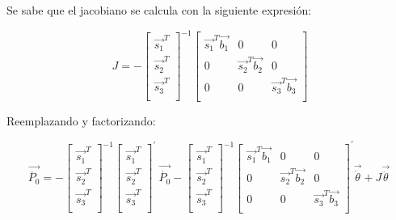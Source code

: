 \newpage
        Se sabe que el jacobiano se calcula con la siguiente expresión: 
        
         \[ J=- \left[ \begin{matrix}
        \overrightarrow{s_{1}}^{T}\\
        \overrightarrow{s_{2}}^{T}\\
        \overrightarrow{s_{3}}^{T}\\
        \end{matrix}
         \right] ^{-1} \left[ \begin{matrix}
        \overrightarrow{s_{1}}^{T}\overrightarrow{b_{1}}  &  0  &  0\\
        0  &  \overrightarrow{s_{2}}^{T}\overrightarrow{b_{2}}  &  0\\
        0  &  0  &  \overrightarrow{s_{3}}^{T}\overrightarrow{b_{3}}\\
        \end{matrix}
         \right]  \] 
        
        Reemplazando y factorizando:
        
         \[ \overrightarrow{\ddot{P_{0}}}=- \left[ \begin{matrix}
        \overrightarrow{s_{1}}^{T}\\
        \overrightarrow{s_{2}}^{T}\\
        \overrightarrow{s_{3}}^{T}\\
        \end{matrix}
         \right] ^{-1} \left[ \begin{matrix}
        \overrightarrow{s_{1}}^{T}\\
        \overrightarrow{s_{2}}^{T}\\
        \overrightarrow{s_{3}}^{T}\\
        \end{matrix}
         \right] ^{'}~\overrightarrow{\dot{P_{0}}}- \left[ \begin{matrix}
        \overrightarrow{s_{1}}^{T}\\
        \overrightarrow{s_{2}}^{T}\\
        \overrightarrow{s_{3}}^{T}\\
        \end{matrix}
         \right] ^{-1} \left[ \begin{matrix}
        \overrightarrow{s_{1}}^{T}\overrightarrow{b_{1}}  &  0  &  0\\
        0  &  \overrightarrow{s_{2}}^{T}\overrightarrow{b_{2}}  &  0\\
        0  &  0  &  \overrightarrow{s_{3}}^{T}\overrightarrow{b_{3}}\\
        \end{matrix}
         \right] ^{'}\overrightarrow{\dot{ \theta }}+J\overrightarrow{\ddot{ \theta }}~ \]
        
